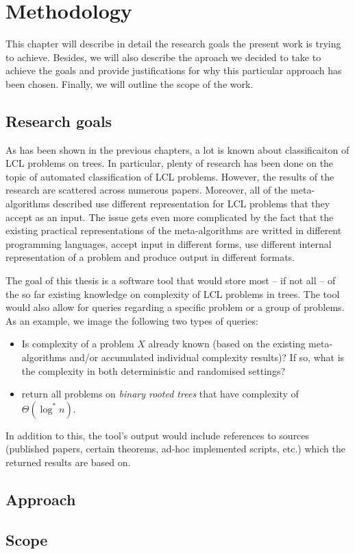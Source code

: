 \chapter{Methodology}
\label{chapter:methods}

This chapter will describe in detail the research goals the present work
is trying to achieve. Besides, we will also describe the aproach we decided
to take to achieve the goals and provide justifications for why this particular
approach has been chosen. Finally, we will outline the scope of the work.

\section{Research goals}

As has been shown in the previous chapters, a lot is known about classificaiton
of LCL problems on trees. In particular, plenty of research has been done
on the topic of automated classification of LCL problems. However, the
results of the research are scattered across numerous papers. Moreover,
all of the meta-algorithms described use different representation for LCL
problems that they accept as an input.
The issue gets even more complicated by the fact that the existing practical representations
of the meta-algorithms are writted in different programming languages, accept input in
different forms,
use different internal representation of a problem and produce output in different
formats.

The goal of this thesis is a software tool that would store most -- if not all -- of
the so far existing knowledge on complexity of LCL problems in trees.
The tool would also allow for queries regarding a specific problem or a group of
problems. As an example, we image the following two types of queries:
\begin{itemize}
  \item Is complexity of a problem $X$ already known (based on the existing meta-algorithms
  and/or accumulated individual complexity results)? If so, what is the complexity in both
  deterministic and randomised settings?
  \item return all problems on \emph{binary rooted trees} that have complexity of
  $\Theta(\log^* n)$.
\end{itemize}
In addition to this, the tool’s output would include references to sources
(published papers, certain theorems, ad-hoc implemented scripts, etc.)
which the returned results are based on.

\section{Approach}



\section{Scope}
